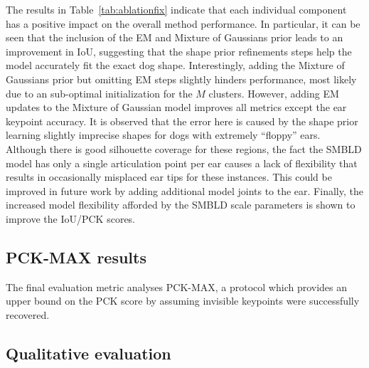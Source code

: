 The results in Table~\ref{tab:ablationfix} indicate that each individual component has a positive impact on the overall method performance. In particular, it can be seen that the inclusion of the EM and Mixture of Gaussians prior leads to an improvement in IoU, suggesting that the shape prior refinements steps help the model accurately fit the exact dog shape. Interestingly, adding the Mixture of Gaussians prior but omitting EM steps slightly hinders performance, most likely due to an sub-optimal initialization for the $M$ clusters. However, adding EM updates to the Mixture of Gaussian model improves all metrics except the ear keypoint accuracy. It is observed that the error here is caused by the shape prior learning slightly imprecise shapes for dogs with extremely ``floppy'' ears. Although there is good silhouette coverage for these regions, the fact the SMBLD model has only a single articulation point per ear causes a lack of flexibility that results in occasionally misplaced ear tips for these instances. This could be improved in future work by adding additional model joints to the ear. Finally, the increased model flexibility afforded by the SMBLD scale parameters is shown to improve the IoU/PCK scores. 

\subsection{PCK-MAX results}

The final evaluation metric analyses PCK-MAX, a protocol which provides an upper bound on the PCK score by assuming invisible keypoints were successfully recovered.





% 


% 
% 

\subsection{Qualitative evaluation}

